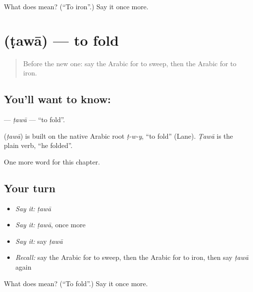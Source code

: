 \begin{tcolorbox}[breakable,colback=teal!4,colframe=teal!35!black,title={Before you move on}]
What does  mean? (\textquotedblleft{}To iron\textquotedblright{}.) Say it once more.
\end{tcolorbox}
\section[\texorpdfstring{\ar{طوى} (ṭawā)}{طوى (ṭawā)}]{ (ṭawā) — to fold}

\label{lesson:AR-C223-tawa}



\begin{quote}
Before the new one: say the Arabic for to sweep, then the Arabic for to iron.
\end{quote}

\subsection*{You'll want to know: }
\textbf{} — \emph{ṭawā} — \textquotedblleft{}to fold\textquotedblright{}.

\begin{cousinweb}
\textbf{} (\emph{ṭawā}) is built on the native Arabic root \emph{ṭ-w-y}, \textquotedblleft{}to fold\textquotedblright{} (Lane). \emph{Ṭawā} is the plain verb, \textquotedblleft{}he folded\textquotedblright{}.
\end{cousinweb}

\begin{grammarlens}[title={What you've built}]
One more word for this chapter.
\end{grammarlens}

\subsection*{Your turn}
\begin{itemize}
\raggedright
  \item \emph{Say it:} \emph{ṭawā}
  \item \emph{Say it:} \emph{ṭawā}, once more
  \item \emph{Say it:} say \emph{ṭawā}
  \item \emph{Recall:} say the Arabic for to sweep, then the Arabic for to iron, then say \emph{ṭawā} again
\end{itemize}

\begin{tcolorbox}[breakable,colback=teal!4,colframe=teal!35!black,title={Before you move on}]
What does  mean? (\textquotedblleft{}To fold\textquotedblright{}.) Say it once more.
\end{tcolorbox}
